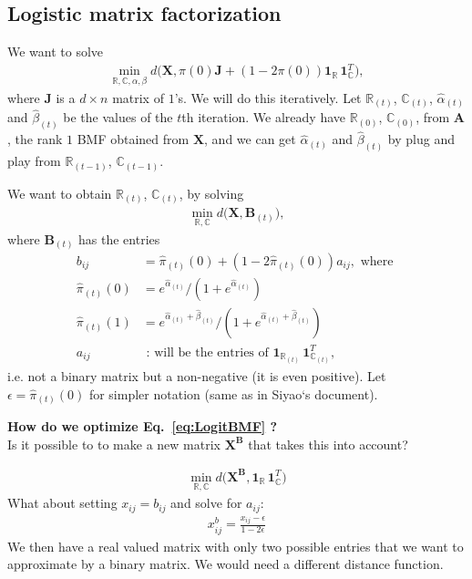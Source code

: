\documentclass[12pt]{article}
\begin{document}
\subsection{Logistic matrix factorization} %

We want to solve 
\begin{align}
  \min_{\mathbb{R},\mathbb{C}, \alpha, \beta} d \big (\mathbf{X}, \pi(0) \mathbf{J} +  (1 - 2 \pi(0)) \mathbf{1}_{\mathbb{R}} \, \mathbf{1}_{\mathbb{C}}^T),
\end{align}
where $\mathbf{J}$ is a $d \times n$ matrix of $1$'s. 
We will do this iteratively. 
Let $\mathbb{R}_{(t)}$, $\mathbb{C}_{(t)}$, $\hat{\alpha}_{(t)}$ and $\hat{\beta}_{(t)}$ be the values of the $t$th iteration. 
We already have $\mathbb{R}_{(0)}$, $\mathbb{C}_{(0)}$, from $\mathbf{A}$, the rank $1$ BMF obtained from $\mathbf{X}$, and we can get $\hat{\alpha}_{(t)}$ and $\hat{\beta}_{(t)}$ by plug and play from $\mathbb{R}_{(t-1)}$, $\mathbb{C}_{(t-1)}$.

We want to obtain $\mathbb{R}_{(t)}$, $\mathbb{C}_{(t)}$, by solving
\begin{align} \label{eq:LogitBMF}
  \min_{\mathbb{R},\mathbb{C}} d \big (\mathbf{X}, \mathbf{B}_{(t)}),
\end{align}
where $\mathbf{B}_{(t)}$ has the entries 
\begin{align*}
  b_{ij} & = \hat{\pi}_{(t)}(0) +  (1-2 \hat{\pi}_{(t)}(0)) a_{ij}, \text{ where } \\
  \hat{\pi}_{(t)}(0) & =  e^{\hat{\alpha}_{(t)}}/(1+e^{\hat{\alpha}_{(t)}}) \\
  \hat{\pi}_{(t)}(1) & =  e^{\hat{\alpha}_{(t)}+\hat{\beta}_{(t)}}/(1+e^{\hat{\alpha}_{(t)}+\hat{\beta}_{(t)}}) \\
  a_{ij} & \text{ : will be the entries of }  \mathbf{1}_{\mathbb{R}_{(t)}} \, \mathbf{1}_{\mathbb{C}_{(t)}}^T, 
\end{align*} 
i.e. not a binary matrix but a non-negative (it is even positive).
Let $ \epsilon =  \hat{\pi}_{(t)}(0)$ for simpler notation (same as in Siyao`s document).

\vspace{3mm}
{\bf How do we optimize Eq.~\ref{eq:LogitBMF} ?}\\
Is it possible to to make a new matrix $\mathbf{X}^\mathbf{B}$ that takes this into account? 

\begin{align} \label{eq:XB}
  \min_{\mathbb{R},\mathbb{C}} d \big (\mathbf{X}^\mathbf{B}, \mathbf{1}_{\mathbb{R}} \, \mathbf{1}_{\mathbb{C}}^T)
\end{align}
What about setting $x_{ij} = b_{ij}$ and solve for $a_{ij}$:
\begin{align} \label{eq:xb}
  x_{ij}^b = \frac{x_{ij}-\epsilon}{1-2\epsilon}
\end{align}
We then have a real valued matrix with only two possible entries that we want to approximate by a binary matrix. 
We would need a different distance function.
\end{document}

